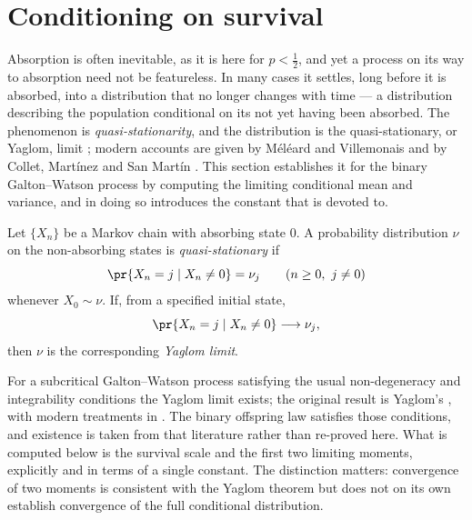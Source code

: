\section{Conditioning on survival}
\label{m:sec:qsd}

Absorption is often inevitable, as it is here for $p<\tfrac12$, and yet a process
on its way to absorption need not be featureless. In many cases it settles, long
before it is absorbed, into a distribution that no longer changes with time --- a
distribution describing the population conditional on its not yet having been
absorbed. The phenomenon is \emph{quasi-stationarity}, and the distribution is the
quasi-stationary, or Yaglom, limit \cite{Yaglom1947}; modern accounts are given by
Méléard and Villemonais \cite{Meleard2012} and by Collet, Martínez and San Martín
\cite{Collet2013}. This section establishes it for the binary Galton--Watson
process by computing the limiting conditional mean and variance, and in doing so
introduces the constant that \ChA{} is devoted to.

\begin{definition}
\label{m:def:qsd}
Let $\{X_n\}$ be a Markov chain with absorbing state $0$. A probability
distribution $\nu$ on the non-absorbing states is \emph{quasi-stationary} if
\begin{equation}
\label{m:eq:qsddef}
\pr{X_n = j\mid X_n\neq0} = \nu_j
\qquad(n\ge0,\ j\neq0)
\end{equation}
whenever $X_0\sim\nu$. If, from a specified initial state,
\begin{equation}
\label{m:eq:yaglomdef}
\pr{X_n = j\mid X_n\neq0}\longrightarrow\nu_j ,
\end{equation}
then $\nu$ is the corresponding \emph{Yaglom limit}.
\end{definition}

For a subcritical Galton--Watson process satisfying the usual non-degeneracy and
integrability conditions the Yaglom limit exists; the original result is Yaglom's
\cite{Yaglom1947}, with modern treatments in
\cite{Harris1963,Athreya1972,Meleard2012}. The binary offspring law satisfies those
conditions, and existence is taken from that literature rather than re-proved here.
What is computed below is the survival scale and the first two limiting moments,
explicitly and in terms of a single constant. The distinction matters: convergence
of two moments is consistent with the Yaglom theorem but does not on its own
establish convergence of the full conditional distribution.

